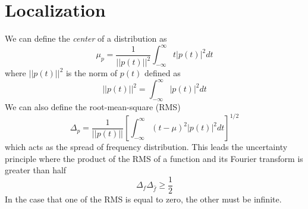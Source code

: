 \documentclass{report}
\theoremstyle{definition}
\theoremstyle{remark}
\begin{document}
\section{Localization}
We can define the \textit{center} of a distribution as 
\begin{equation*}
    \mu_p = \frac{1}{||p(t)||^2}\int^\infty_{-\infty}t|p(t)|^2dt
\end{equation*}
where $||p(t)||^2$ is the norm of $p(t)$ defined as 
\begin{equation*}
    ||p(t)||^2= \int^\infty_{-\infty}|p(t)|^2dt
\end{equation*}
We can also define the root-mean-square (RMS) 
\begin{equation*}
    \Delta_p = \frac{1}{||p(t)||}\left[\int^\infty_{-\infty}(t-\mu)^2|p(t)|^2dt \right]^{1/2} 
\end{equation*}
which acts as the spread of frequency distribution. This leads the uncertainty principle where the product of the RMS of a function and its Fourier transform is greater than half
\begin{equation*}
    \Delta_f \Delta_{\hat f} \geq \frac{1}{2}
\end{equation*}
In the case that one of the RMS is equal to zero, the other must be infinite. 
\end{document}
